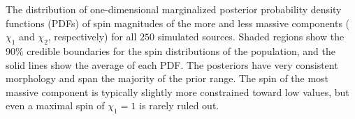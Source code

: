 \label{fig:spinPDFcred} The distribution of one-dimensional marginalized posterior probability density functions (PDFs) of spin magnitudes of the more and less massive components ($\chi_1$ and $\chi_2$, respectively) for all $250$ simulated sources. Shaded regions show the $90\%$ credible boundaries for the spin distributions of the population, and the solid lines show the average of each PDF.  The posteriors have very consistent morphology and span the majority of the prior range.  The spin of the most massive component is typically slightly more constrained toward low values, but even a maximal spin of $\chi_1 = 1$ is rarely ruled out.
  